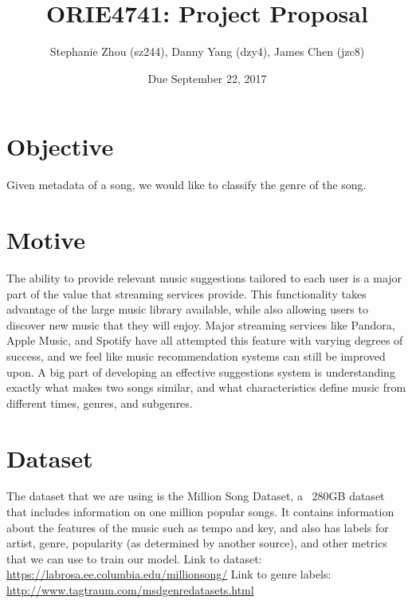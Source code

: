 \documentclass{article}
\title{ORIE4741: Project Proposal}
\author{Stephanie Zhou (sz244), Danny Yang (dzy4), James Chen (jzc8)}
\date{Due September 22, 2017}
\begin{document}
\maketitle 
\section*{Objective}

Given metadata of a song, we would like to classify the genre of the song.
\section*{Motive}
The ability to provide relevant music suggestions tailored to each user is a major part of the value that streaming services provide. This functionality takes advantage of the large music library available, while also allowing users to discover new music that they will enjoy. Major streaming services like Pandora, Apple Music, and Spotify have all attempted this feature with varying degrees of success, and we feel like music recommendation systems can still be improved upon.
A big part of developing an effective suggestions system is understanding exactly what makes two songs similar, and what characteristics define music from different times, genres, and subgenres.

\section*{Dataset}

The dataset that we are using is the Million Song Dataset, a ~280GB dataset that includes information on one million popular songs. It contains information about the features of the music such as tempo and key, and also has labels for artist, genre, popularity (as determined by another source), and other metrics that we can use to train our model.
\newline
Link to dataset:
\href{https://labrosa.ee.columbia.edu/millionsong/}{https://labrosa.ee.columbia.edu/millionsong/}
\newline
Link to genre labels:
\href{http://www.tagtraum.com/msd_genre_datasets.html}{http://www.tagtraum.com/msd\textunderscore genre\textunderscore datasets.html}
\end{document}
